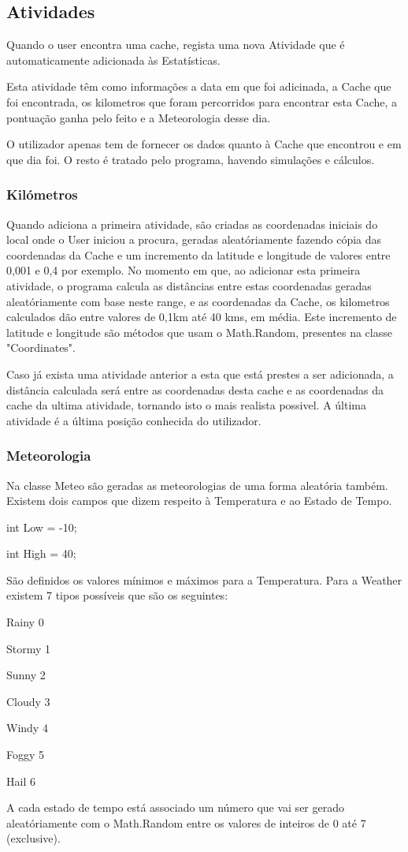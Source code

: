 \documentclass{article}
\begin{document}
\subsection{Atividades}
\quad Quando o user encontra uma cache, regista uma nova Atividade que é automaticamente adicionada às Estatísticas.
\par Esta atividade têm como informações a data em que foi adicinada, a Cache que foi encontrada, os kilometros que foram percorridos para encontrar esta Cache, a pontuação ganha pelo feito e a Meteorologia desse dia.
\par O utilizador apenas tem de fornecer os dados quanto à Cache que encontrou e em que dia foi. O resto é tratado pelo programa, havendo simulações e cálculos.

\subsubsection{Kilómetros}
\quad  Quando adiciona a primeira atividade, são criadas as coordenadas iniciais do local onde o User iniciou a procura, geradas aleatóriamente fazendo cópia das coordenadas da Cache e um incremento da latitude e longitude de valores entre 0,001 e 0,4 por exemplo. No momento em que, ao adicionar esta primeira atividade, o programa calcula as distâncias entre estas coordenadas geradas aleatóriamente com base neste range, e as coordenadas da Cache, os kilometros calculados dão entre valores de 0,1km até 40 kms, em média.
Este incremento de latitude e longitude são métodos que usam o Math.Random, presentes na classe "Coordinates".
\par Caso já exista uma atividade anterior a esta que está prestes a ser adicionada, a distância calculada será entre as coordenadas desta cache e as coordenadas da cache da ultima atividade, tornando isto o mais realista possivel. A última atividade é a última posição conhecida do utilizador.
\\


\subsubsection{Meteorologia}
\quad  Na classe Meteo são geradas as meteorologias de uma forma aleatória também. Existem dois campos que dizem respeito à Temperatura e ao Estado de Tempo. 
\par int Low = -10;
\par int High = 40;
\par São definidos os valores mínimos e máximos para a Temperatura. Para a Weather existem 7 tipos possíveis que são os seguintes:
\par Rainy 0
\par Stormy 1
\par Sunny 2
\par Cloudy 3
\par Windy 4
\par Foggy 5
\par Hail 6
\par A cada estado de tempo está associado um número que vai ser gerado aleatóriamente com o Math.Random entre os valores de inteiros de 0 até 7 (exclusive).
\\
\end{document}
